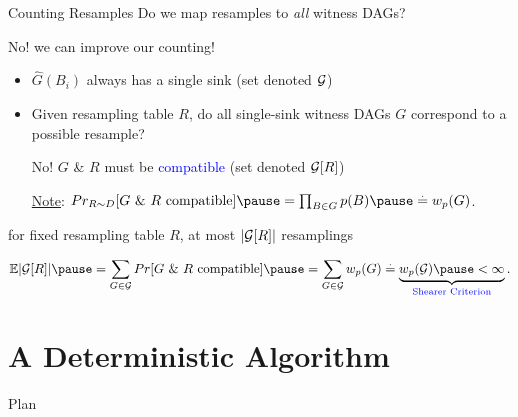 \documentclass{beamer}
\def\spadding{\vspace{0.25cm}}
\def\b{\textcolor{blue}}
\newcommand*{\eqdef}{\overset{.}{=}}
\begin{document}
\begin{frame}{Counting Resamples}
Do we map resamples to \emph{all} witness DAGs?\pause\par
No! \follows we can improve our counting!\pause\spadding

\begin{itemize}
    \item $\hat{G}(B_i)$ always has a single sink (set denoted $\mathcal{G}$)\pause
    \item Given resampling table $R$, do all single-sink witness DAGs $G$ correspond to a possible resample?\pause
    
    \follows No! \pause$G$ \& $R$ must be \b{compatible} (set denoted $\mathcal{G}[R]$)\pause\spadding
    
    \underline{Note}: $\Pr[R \sim D]{\text{$G$ \& $R$ compatible}} \pause= \prod_{B \in G} \law(B) \pause\eqdef \w(G)$.
\end{itemize}\pause\spadding

\follows for fixed resampling table $R$, at most $|\mathcal{G}[R]|$ resamplings\pause

\vspace{-1.5em}\begin{align*}
    \E{|\compat{\G}{R}|} \pause= \sum_{G \in \G} \Pr{\text{$G$ \& $R$ compatible}} \pause= \sum_{G\in\G} \w(G) \eqdef \underbrace{\w(\G) \pause < \infty}_{\text{\b{Shearer Criterion}}}.
\end{align*}
\end{frame}

\section{A Deterministic Algorithm}
\begin{frame}{Plan}
\tableofcontents[currentsection, sectionstyle=show/shaded, hideothersubsections]
\end{frame}
\end{document}
